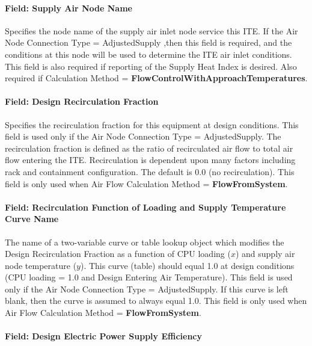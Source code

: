 \paragraph{Field: Supply Air Node Name}\label{field-supply-air-node-name}

Specifies the node name of the supply air inlet node service this ITE. If the Air Node Connection Type = AdjustedSupply ,then this field is required, and the conditions at this node will be used to determine the ITE air inlet conditions. This field is also required if reporting of the Supply Heat Index is desired. Also required if Calculation Method = \textbf{FlowControlWithApproachTemperatures}.

\paragraph{Field: Design Recirculation Fraction}\label{field-design-recirculation-fraction}

Specifies the recirculation fraction for this equipment at design conditions. This field is used only if the Air Node Connection Type = AdjustedSupply. The recirculation fraction is defined as the ratio of recirculated air flow to total air flow entering the ITE. Recirculation is dependent upon many factors including rack and containment configuration. The default is 0.0 (no recirculation). This field is only used when Air Flow Calculation Method = \textbf{FlowFromSystem}.

\paragraph{Field: Recirculation Function of Loading and Supply Temperature Curve Name}\label{field-recirculation-function-of-loading-and-supply-temperature-curve-name}

The name of a two-variable curve or table lookup object which modifies the Design Recirculation Fraction as a function of CPU loading ($x$) and supply air node temperature ($y$). This curve (table) should equal 1.0 at design conditions (CPU loading = 1.0 and Design Entering Air Temperature). This field is used only if the Air Node Connection Type = AdjustedSupply. If this curve is left blank, then the curve is assumed to always equal 1.0. This field is only used when Air Flow Calculation Method = \textbf{FlowFromSystem}.

\paragraph{Field: Design Electric Power Supply Efficiency}\label{field-design-electric-power-supply-efficiency}

